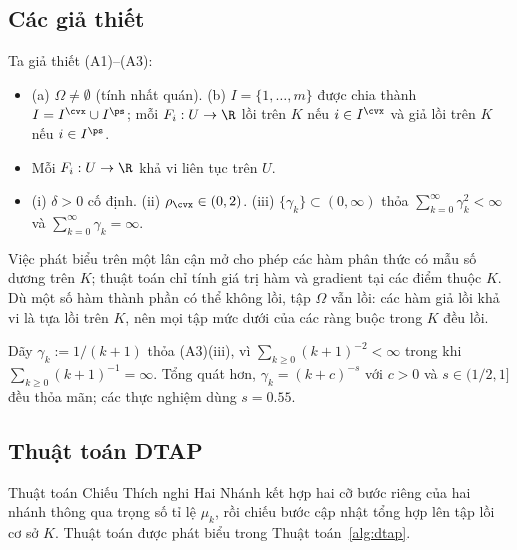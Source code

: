 \subsection{Các giả thiết}\label{ssec:assumptions}
\begin{assumption}\label{ass:standing}
Ta giả thiết \textup{(A1)--(A3)}:
\begin{itemize}[leftmargin=2.4em,itemsep=2pt]
\item[\textup{(A1)}] \textup{(a)} $\Omega\ne\emptyset$ (tính nhất quán). \textup{(b)} $I=\{1,\dots,m\}$
được chia thành $I=I^{\cvx}\cup I^{\ps}$; mỗi $F_i:U\to\R$ lồi trên $K$ nếu
$i\in I^{\cvx}$ và giả lồi trên $K$ nếu $i\in I^{\ps}$.
\item[\textup{(A2)}] Mỗi $F_i:U\to\R$ khả vi liên tục trên $U$.
\item[\textup{(A3)}] \textup{(i)} $\delta>0$ cố định. \textup{(ii)}
$\rho_{\cvx}\in(0,2)$. \textup{(iii)} $\{\gamma_k\}\subset(0,\infty)$ thỏa
$\sum_{k=0}^\infty\gamma_k^2<\infty$ và $\sum_{k=0}^\infty\gamma_k=\infty$.
\end{itemize}
\end{assumption}
Việc phát biểu trên một lân cận mở cho phép các hàm phân thức có mẫu số
dương trên $K$; thuật toán chỉ tính giá trị hàm và gradient tại các điểm thuộc $K$.
Dù một số hàm thành phần có thể không lồi, tập $\Omega$ vẫn lồi: các hàm giả lồi khả vi
là tựa lồi trên $K$, nên mọi tập mức dưới của các ràng buộc trong $K$ đều lồi.
\begin{example}\label{ex:gamma}
Dãy $\gamma_k:=1/(k+1)$ thỏa (A3)(iii), vì $\sum_{k\ge0}(k+1)^{-2}<\infty$
trong khi $\sum_{k\ge0}(k+1)^{-1}=\infty$. Tổng quát hơn, $\gamma_k=(k+c)^{-s}$ với $c>0$
và $s\in(1/2,1]$ đều thỏa mãn; các thực nghiệm dùng $s=0.55$.
\end{example}

\subsection{Thuật toán DTAP}\label{ssec:algorithm}
Thuật toán Chiếu Thích nghi Hai Nhánh kết hợp hai cỡ bước riêng của hai nhánh
thông qua trọng số tỉ lệ $\mu_k$, rồi chiếu bước cập nhật tổng hợp lên tập lồi cơ sở
$K$. Thuật toán được phát biểu trong Thuật toán~\ref{alg:dtap}.

